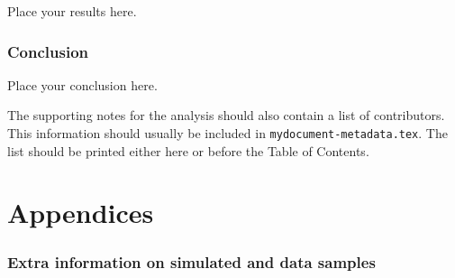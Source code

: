 \documentclass[NOTE, atlasdraft=true, texlive=2016, UKenglish]{atlasdoc}
\begin{document}
Place your results here.


\section{Conclusion}
\label{sec:conclusion}

Place your conclusion here.

\printbibliography
%
%

\clearpage
The supporting notes for the analysis should also contain a list of contributors.
This information should usually be included in \texttt{mydocument-metadata.tex}.
The list should be printed either here or before the Table of Contents.

\clearpage
\appendix
\part*{Appendices}

\section{Extra information on simulated and data samples}
\label{sec:app:data}

\end{document}
